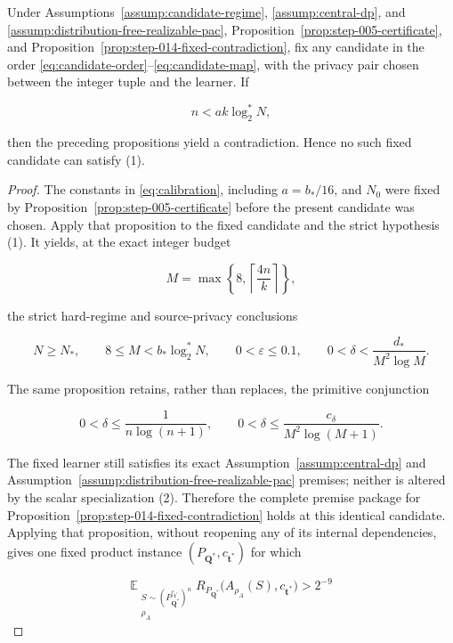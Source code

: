 \begin{lemma}\label{lem:step-015-negated-target}
Under Assumptions~\ref{assump:candidate-regime},
\ref{assump:central-dp}, and
\ref{assump:distribution-free-realizable-pac},
Proposition~\ref{prop:step-005-certificate}, and
Proposition~\ref{prop:step-014-fixed-contradiction}, fix any candidate in
the order \eqref{eq:candidate-order}--\eqref{eq:candidate-map}, with the
privacy pair chosen between the integer tuple and the learner. If

\[
n<ak\log_2^*N,
\tag{1}
\]

then the preceding propositions yield a contradiction. Hence no
such fixed candidate can satisfy (1).
\end{lemma}

\begin{proof}
The constants in \eqref{eq:calibration}, including \(a=b_*/16\), and
\(N_0\) were fixed by
Proposition~\ref{prop:step-005-certificate} before the present
candidate was chosen. Apply that proposition to the fixed candidate and the
strict hypothesis (1). It yields, at the exact integer budget

\[
M=\max\left\{8,\left\lceil\frac{4n}{k}\right\rceil\right\},
\]

the strict hard-regime and source-privacy conclusions

\[
N\ge N_*,\qquad 8\le M<b_*\log_2^*N,
\qquad 0<\varepsilon\le0.1,
\qquad 0<\delta<\frac{d_*}{M^2\log M}.
\tag{2}
\]

The same proposition retains, rather than replaces, the primitive
conjunction

\[
0<\delta\le\frac{1}{n\log(n+1)},
\qquad
0<\delta\le\frac{c_\delta}{M^2\log(M+1)}.
\tag{3}
\]

The fixed learner still satisfies its exact
Assumption~\ref{assump:central-dp} and
Assumption~\ref{assump:distribution-free-realizable-pac} premises; neither
is altered by the scalar specialization (2). Therefore the complete
premise package for
Proposition~\ref{prop:step-014-fixed-contradiction} holds at this identical
candidate. Applying that proposition, without reopening any of its internal
dependencies, gives one fixed product instance
\((P_{\boldsymbol Q^*},c_{\boldsymbol t^*})\) for which

\[
\mathbb E_{\substack{
 S\sim(P_{\boldsymbol Q^*}^{c_{\boldsymbol t^*}})^n\\
 \rho_A}}
R_{P_{\boldsymbol Q^*}}
\bigl(A_{\rho_A}(S),c_{\boldsymbol t^*}\bigr)>2^{-9}
\tag{4}
\]


\end{proof}
